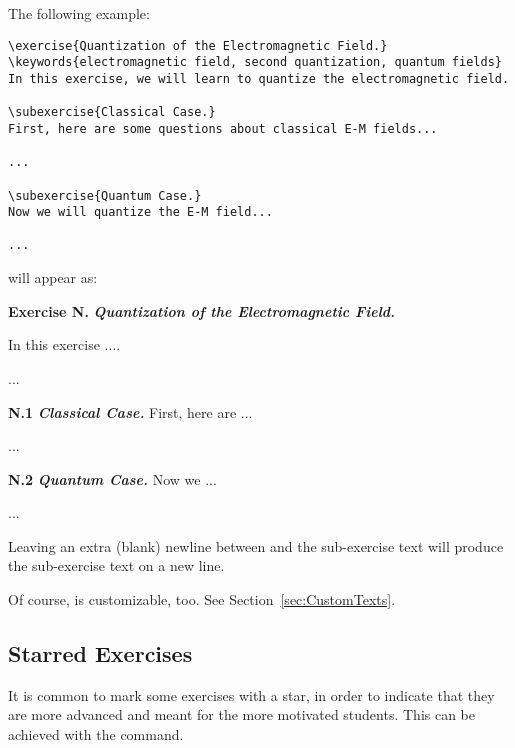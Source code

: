 \documentclass[11pt,a4paper]{article}
\begin{document}
The following example:
\begin{pkgverbatim}
\begin{verbatim}
\exercise{Quantization of the Electromagnetic Field.}
\keywords{electromagnetic field, second quantization, quantum fields}
In this exercise, we will learn to quantize the electromagnetic field.

\subexercise{Classical Case.}
First, here are some questions about classical E-M fields...

...

\subexercise{Quantum Case.}
Now we will quantize the E-M field...

...

\end{verbatim}
\end{pkgverbatim}
will appear as:
\begin{pkgverbatim}[0mm]
  {\bf Exercise N.} \hspace*{2mm} {\em\bfseries Quantization of the Electromagnetic Field.}

  In this exercise ....

  ...

  {\bf N.1}\hspace*{1mm} {\em\bfseries Classical Case.}\hspace*{3mm} First, here are ...

  ...

  {\bf N.2}\hspace*{1mm} {\em\bfseries Quantum Case.}\hspace*{3mm} Now we ...

  ...
  
\end{pkgverbatim}

\begin{pkgtip}
  Leaving an extra (blank) newline between  and the sub-exercise text
  will produce the sub-exercise text on a new line.
\end{pkgtip}

\begin{pkgtip}
  Of course,  is customizable, too. See Section~\ref{sec:CustomTexts}.
\end{pkgtip}


\subsection{Starred Exercises}

It is common to mark some exercises with a star, in order to indicate that they are more
advanced and meant for the more motivated students.
This can be achieved with the  command.
\end{document}
